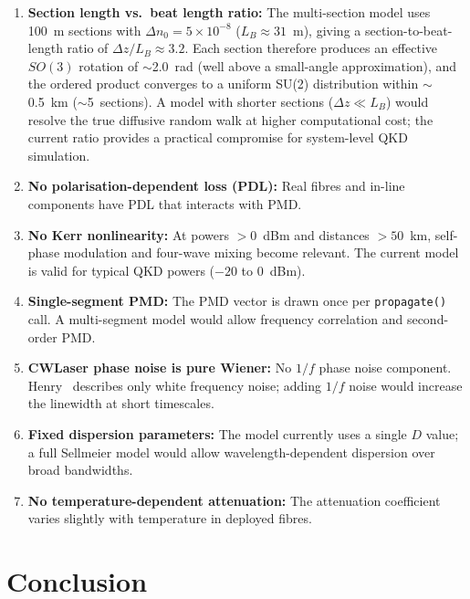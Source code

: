 \documentclass[11pt,a4paper]{article}
\begin{document}
\begin{enumerate}[nosep]
  \item \textbf{Section length vs.\ beat length ratio:} The multi-section
    model uses 100~m sections with $\Delta n_0 = 5\times10^{-8}$
    ($L_B \approx 31$~m), giving a section-to-beat-length ratio of
    $\Delta z / L_B \approx 3.2$.  Each section therefore produces an
    effective $SO(3)$ rotation of $\sim$2.0~rad (well above a small-angle
    approximation), and the ordered product converges to a uniform SU(2)
    distribution within $\sim$0.5~km ($\sim$5~sections).  A model with
    shorter sections ($\Delta z \ll L_B$) would resolve the true
    diffusive random walk at higher computational cost; the current ratio
    provides a practical compromise for system-level QKD simulation.

  \item \textbf{No polarisation-dependent loss (PDL):} Real fibres and
    in-line components have PDL that interacts with PMD.

  \item \textbf{No Kerr nonlinearity:} At powers $>0$~dBm and
    distances $>50$~km, self-phase modulation and four-wave mixing
    become relevant.  The current model is valid for typical QKD
    powers ($-20$ to $0$~dBm).

  \item \textbf{Single-segment PMD:} The PMD vector is drawn once per
    \texttt{propagate()} call.  A multi-segment model would allow frequency
    correlation and second-order PMD.

  \item \textbf{CWLaser phase noise is pure Wiener:} No $1/f$ phase noise
    component.  Henry~\cite{henry} describes only white frequency noise;
    adding $1/f$ noise would increase the linewidth at short timescales.

  \item \textbf{Fixed dispersion parameters:} The model currently uses
    a single $D$ value; a full Sellmeier model would allow
    wavelength-dependent dispersion over broad bandwidths.

  \item \textbf{No temperature-dependent attenuation:} The attenuation
    coefficient varies slightly with temperature in deployed fibres.
\end{enumerate}

\section{Conclusion}
\end{document}
